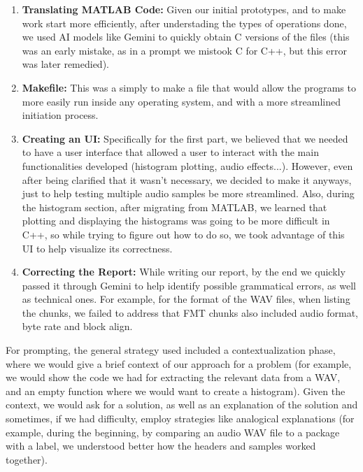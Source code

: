 \begin{enumerate}

    \item \textbf{Translating MATLAB Code:} Given our initial prototypes, and to make work start more efficiently, after understading the types of operations done, we used AI models like Gemini to quickly obtain C versions of the files (this was an early mistake, as in a prompt we mistook C for C++, but this error was later remedied).
    
    \item \textbf{Makefile:} This was a simply to make a file that would allow the programs to more easily run inside any operating system, and with a more streamlined initiation process.
    
    \item \textbf{Creating an UI:} Specifically for the first part, we believed that we needed to have a user interface that allowed a user to interact with the main functionalities developed (histogram plotting, audio effects...). However, even after being clarified that it wasn't necessary, we decided to make it anyways, just to help testing multiple audio samples be more streamlined. Also, during the histogram section, after migrating from MATLAB, we learned that plotting and displaying the histograms was going to be more difficult in C++, so while trying to figure out how to do so, we took advantage of this UI to help visualize its correctness.
    
    \item \textbf{Correcting the Report:} While writing our report, by the end we quickly passed it through Gemini to help identify possible grammatical errors, as well as technical ones. For example, for the format of the WAV files, when listing the chunks, we failed to address that FMT chunks also included audio format, byte rate and block align.

\end{enumerate}

For prompting, the general strategy used included a contextualization phase, where we would give a brief context of our approach for a problem (for example, we would show the code we had for extracting the relevant data from a WAV, and an empty function where we would want to create a histogram). Given the context, we would ask for a solution, as well as an explanation of the solution and sometimes, if we had difficulty, employ strategies like analogical explanations (for example, during the beginning, by comparing an audio WAV file to a package with a label, we understood better how the headers and samples worked together).